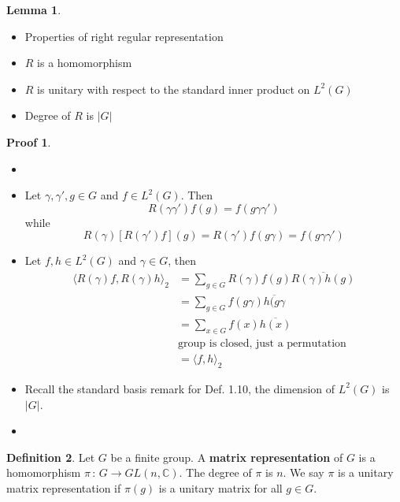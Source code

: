 \documentclass{book}
\newcommand{\C}{\mathbb{C}}
\newcommand{\define}[1]{\textbf{#1}}
\newcommand{\inner}[1]{\langle #1 \rangle}
\newcommand{\abs}[1]{\lvert #1 \rvert }
\theoremstyle{definition}
\newtheorem{lemma}{Lemma}[chapter]
\newtheorem{definition}[lemma]{Definition}
\theoremstyle{remarkstyle}
\newtheorem*{myproof}{Proof}%
\begin{document}
\begin{lemma}
    \begin{itemize}
        \item Properties of right regular representation
        \item $R$ is a homomorphism 
        \item $R$ is unitary with respect to the standard inner product on $L^2(G)$
        \item Degree of $R$ is $\abs{G}$
    \end{itemize}
\end{lemma}
\begin{myproof}
    \begin{itemize}
        \item[]
        \item Let $\gamma, \gamma',g\in G$ and $f\in L^2(G)$. Then 
        $$
        R(\gamma\gamma')f(g) = f(g\gamma\gamma')
        $$
        while 
        $$
        R(\gamma)[R(\gamma')f](g) = R(\gamma')f(g\gamma) = f(g\gamma\gamma')
        $$
        \item Let $f,h\in L^2(G)$ and $\gamma\in G$, then 
        \begin{align*}
            \inner{R(\gamma)f,R(\gamma)h}_2 
            &= \sum_{g\in G}R(\gamma)f(g)\overline{R(\gamma)h(g)} \\
            &= \sum_{g\in G}f(g\gamma)\overline{h(g\gamma} \\
            &= \sum_{x\in G}f(x)\overline{h(x)} \\
            &\textrm{group is closed, just a permutation} \\
            &= \inner{f,h}_2
        \end{align*}
        \item Recall the standard basis remark for Def. 1.10, the dimension of $L^2(G)$ is $\abs{G}$.
        \item[] 
    \end{itemize}
\end{myproof}

\begin{definition}
    Let $G$ be a finite group. A \define{matrix representation} of $G$ is a homomorphism $\pi\,:\, G\rightarrow GL(n,\C) $. The degree of $\pi$ is $n$. We say $\pi$ is a unitary matrix representation if $\pi(g)$ is a unitary matrix for all $g\in G$. \newline
\end{definition}
\end{document}
